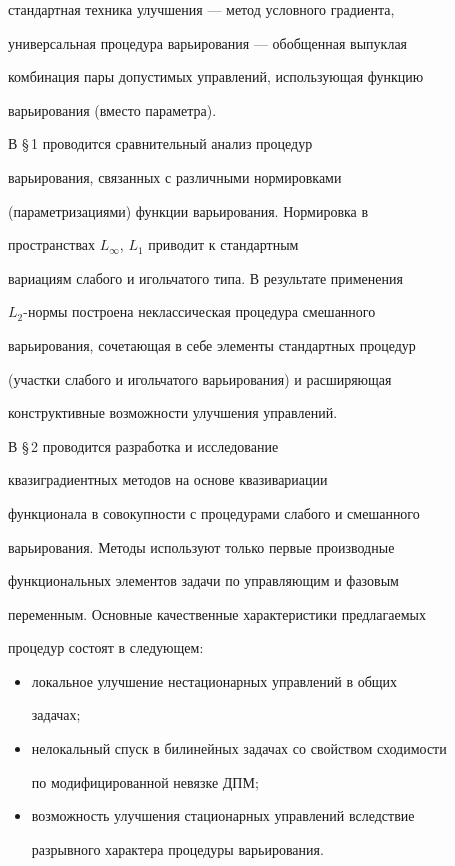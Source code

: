 стандартная техника улучшения --- метод условного градиента,


универсальная процедура варьирования --- обобщенная выпуклая


комбинация пары допустимых управлений, использующая функцию


варьирования (вместо параметра).





В \S\,1 проводится сравнительный анализ процедур


варьирования, связанных с различными нормировками


(параметризациями) функции варьирования. Нормировка в


пространствах $L_{\infty}$, $L_{1}$ приводит к стандартным


вариациям слабого и игольчатого типа. В результате применения


$L_{2}$-нормы построена неклассическая процедура смешанного


варьирования, сочетающая в себе элементы стандартных процедур


(участки слабого и игольчатого варьирования) и расширяющая


конструктивные возможности улучшения управлений. 





В \S\,2 проводится разработка и исследование


квазиградиентных методов на основе квазивариации


функционала в совокупности с процедурами слабого и смешанного


варьирования. Методы используют только первые производные


функциональных элементов задачи по управляющим и фазовым


переменным. Основные качественные характеристики предлагаемых


процедур состоят в следующем:


\begin{itemize}


\item[---] локальное улучшение нестационарных управлений в общих


задачах;


\item[---] нелокальный спуск в билинейных задачах со свойством сходимости


по модифицированной невязке ДПМ;


\item[---] возможность улучшения стационарных управлений вследствие


разрывного характера процедуры варьирования.


\end{itemize}





